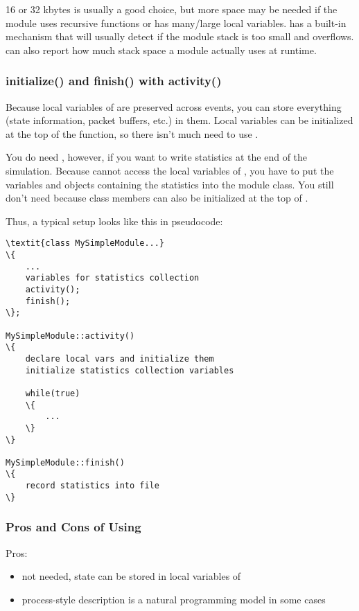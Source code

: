 16 or 32 kbytes is usually a good choice, but more space may be needed
if the module uses recursive functions or has many/large local variables.
{\opp} has a built-in mechanism that will usually detect if the module stack
is too small and overflows. {\opp} can also report how
much stack space a module actually uses at runtime.


\subsubsection{initialize() and finish() with activity()}
\label{sec:simple-modules:activity:initialize-and-finish}

Because local variables of  are preserved across
events, you can store everything (state information, packet buffers,
etc.) in them. Local variables can be initialized at the top of the
 function, so there isn't much need to use
.

You do need , however, if you want to write statistics at
the end of the simulation. Because  cannot access
the local variables of , you have to put the variables
and objects containing the statistics into the module class.
You still don't need  because class members can also
be initialized at the top of .

Thus, a typical setup looks like this in pseudocode:

\begin{Verbatim}[commandchars=\\\{\}]
\textit{class MySimpleModule...}
\{
    ...
    variables for statistics collection
    activity();
    finish();
\};

MySimpleModule::activity()
\{
    declare local vars and initialize them
    initialize statistics collection variables

    while(true)
    \{
        ...
    \}
\}

MySimpleModule::finish()
\{
    record statistics into file
\}
\end{Verbatim}


\subsubsection{Pros and Cons of Using }
\label{sec:simple-modules:activity:pros-and-cons}

Pros:
\begin{itemize}
   \item {} not needed, state can be stored in local
       variables of 
   \item process-style description is a natural programming model in some cases
\end{itemize}

